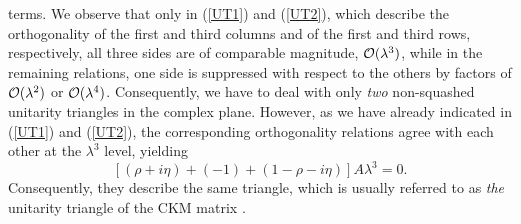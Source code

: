 \documentclass[11pt]{cernrep}
\begin{document}
terms. We observe that only in (\ref{UT1}) and (\ref{UT2}), which 
describe the orthogonality of the first and third columns 
and of the first and third rows, respectively, all three sides are 
of comparable magnitude, ${\cal O}(\lambda^3)$, while in the 
remaining relations, one side is suppressed with respect to the others 
by factors of ${\cal O}(\lambda^2)$ or ${\cal O}(\lambda^4)$. Consequently,
we have to deal with only {\it two} non-squashed unitarity triangles 
in the complex plane. However, as we have already indicated in (\ref{UT1}) 
and (\ref{UT2}), the corresponding orthogonality relations agree with each 
other at the $\lambda^3$ level, yielding
\begin{equation}\label{UTLO}
\left[(\rho+i\eta)+(-1)+(1-\rho-i\eta)\right]A\lambda^3=0.
\end{equation}
Consequently, they describe the same triangle, which is usually referred 
to as {\it the} unitarity triangle of the CKM matrix 
\cite{JS,ut}.
\end{document}
